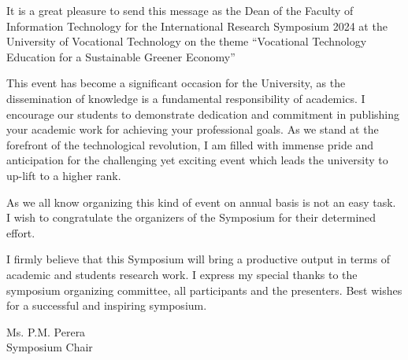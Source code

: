\thispagestyle{fancy}
	




   
    



	

	It is a great pleasure to send this message as the Dean of the Faculty of Information Technology for the International Research Symposium 2024 at the University of Vocational Technology on the theme “Vocational Technology Education for a Sustainable Greener Economy”
    
This event has become a significant occasion for the University, as the dissemination of knowledge is a fundamental responsibility of academics. I encourage our students to demonstrate dedication and commitment in publishing your academic work for achieving your professional goals. As we stand at the forefront of the technological revolution, I am filled with immense pride and anticipation for the challenging yet exciting event which leads the university to up-lift to a higher rank.

As we all know organizing this kind of event on annual basis is not an easy task. I wish to congratulate the organizers of the Symposium for their determined effort.

I firmly believe that this Symposium will bring a productive output in terms of academic and students research work. I express my special thanks to the symposium organizing committee, all participants and the presenters.
Best wishes for a successful and inspiring symposium.

	\vspace{1cm}
	\noindent
    
Ms. P.M. Perera \\
Symposium Chair

	\newpage
	